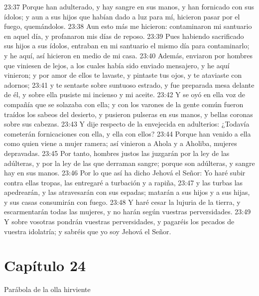 23:37 Porque han adulterado, y hay sangre en sus manos, y han fornicado con sus ídolos; y aun a sus hijos que habían dado a luz para mí, hicieron pasar por el fuego, quemándolos.   
23:38 Aun esto más me hicieron: contaminaron mi santuario en aquel día, y profanaron mis días de reposo.   
23:39 Pues habiendo sacrificado sus hijos a sus ídolos, entraban en mi santuario el mismo día para contaminarlo; y he aquí, así hicieron en medio de mi casa.   
23:40 Además, enviaron por hombres que viniesen de lejos, a los cuales había sido enviado mensajero, y he aquí vinieron; y por amor de ellos te lavaste, y pintaste tus ojos, y te ataviaste con adornos;   
23:41 y te sentaste sobre suntuoso estrado, y fue preparada mesa delante de él, y sobre ella pusiste mi incienso y mi aceite.   
23:42 Y se oyó en ella voz de compañía que se solazaba con ella; y con los varones de la gente común fueron traídos los sabeos del desierto, y pusieron pulseras en sus manos, y bellas coronas sobre sus cabezas.   
23:43 Y dije respecto de la envejecida en adulterios: ¿Todavía cometerán fornicaciones con ella, y ella con ellos?   
23:44 Porque han venido a ella como quien viene a mujer ramera; así vinieron a Ahola y a Aholiba, mujeres depravadas.   
23:45 Por tanto, hombres justos las juzgarán por la ley de las adúlteras, y por la ley de las que derraman sangre; porque son adúlteras, y sangre hay en sus manos.   
23:46 Por lo que así ha dicho Jehová el Señor: Yo haré subir contra ellas tropas, las entregaré a turbación y a rapiña,   
23:47 y las turbas las apedrearán, y las atravesarán con sus espadas; matarán a sus hijos y a sus hijas, y sus casas consumirán con fuego.   
23:48 Y haré cesar la lujuria de la tierra, y escarmentarán todas las mujeres, y no harán según vuestras perversidades.   
23:49 Y sobre vosotras pondrán vuestras perversidades, y pagaréis los pecados de vuestra idolatría; y sabréis que yo soy Jehová el Señor.   
\section*{Capítulo 24}  
Parábola de la olla hirviente   
  
